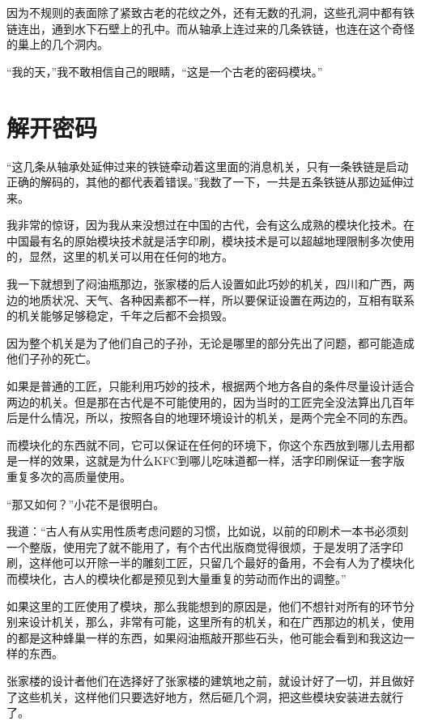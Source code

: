 因为不规则的表面除了紧致古老的花纹之外，还有无数的孔洞，这些孔洞中都有铁链连出，通到水下石壁上的孔中。而从轴承上连过来的几条铁链，也连在这个奇怪的巢上的几个洞内。

“我的天，”我不敢相信自己的眼睛，“这是一个古老的密码模块。”

\chapter{解开密码}

“这几条从轴承处延伸过来的铁链牵动着这里面的消息机关，只有一条铁链是启动正确的解码的，其他的都代表着错误。”我数了一下，一共是五条铁链从那边延伸过来。

我非常的惊讶，因为我从来没想过在中国的古代，会有这么成熟的模块化技术。在中国最有名的原始模块技术就是活字印刷，模块技术是可以超越地理限制多次使用的，显然，这里的机关可以用在任何的地方。

我一下就想到了闷油瓶那边，张家楼的后人设置如此巧妙的机关，四川和广西，两边的地质状况、天气、各种因素都不一样，所以要保证设置在两边的，互相有联系的机关能够足够稳定，千年之后都不会损毁。

因为整个机关是为了他们自己的子孙，无论是哪里的部分先出了问题，都可能造成他们子孙的死亡。

如果是普通的工匠，只能利用巧妙的技术，根据两个地方各自的条件尽量设计适合两边的机关。但是那在古代是不可能使用的，因为当时的工匠完全没法算出几百年后是什么情况，所以，按照各自的地理环境设计的机关，是两个完全不同的东西。

而模块化的东西就不同，它可以保证在任何的环境下，你这个东西放到哪儿去用都是一样的效果，这就是为什么KFC到哪儿吃味道都一样，活字印刷保证一套字版重复多次的高质量使用。

“那又如何？”小花不是很明白。

我道：“古人有从实用性质考虑问题的习惯，比如说，以前的印刷术一本书必须刻一个整版，使用完了就不能用了，有个古代出版商觉得很烦，于是发明了活字印刷，这样他可以开除一半的雕刻工匠，只留几个最好的备用，不会有人为了模块化而模块化，古人的模块化都是预见到大量重复的劳动而作出的调整。”

如果这里的工匠使用了模块，那么我能想到的原因是，他们不想针对所有的环节分别来设计机关，那么，非常有可能，这里所有的机关，和在广西那边的机关，使用的都是这种蜂巢一样的东西，如果闷油瓶敲开那些石头，他可能会看到和我这边一样的东西。

张家楼的设计者他们在选择好了张家楼的建筑地之前，就设计好了一切，并且做好了这些机关，这样他们只要选好地方，然后砸几个洞，把这些模块安装进去就行了。


